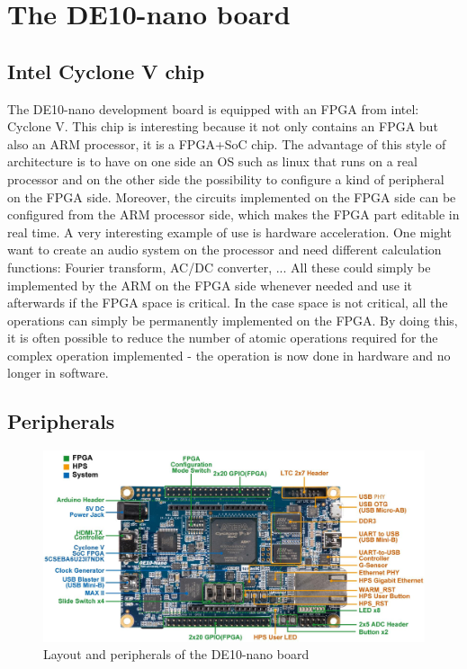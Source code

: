 \documentclass[12pt]{article}
\begin{document}
\section{The DE10-nano board}

\subsection{Intel Cyclone V chip}
The DE10-nano development board is equipped with an FPGA from intel: Cyclone V. This chip is interesting because it not only contains an FPGA but also an ARM processor, it is a FPGA+SoC chip. The advantage of this style of architecture is to have on one side an OS such as linux that runs on a real processor and on the other side the possibility to configure a kind of peripheral on the FPGA side. Moreover, the circuits implemented on the FPGA side can be configured from the ARM processor side, which makes the FPGA part editable in real time. A very interesting example of use is hardware acceleration. One might want to create an audio system on the processor and need different calculation functions: Fourier transform, AC/DC converter, ... All these could simply be implemented by the ARM on the FPGA side whenever needed and use it afterwards if the FPGA space is critical. In the case space is not critical, all the operations can simply be permanently implemented on the FPGA. By doing this, it is often possible to reduce the number of atomic operations required for the complex operation implemented - the operation is now done in hardware and no longer in software.

\subsection{Peripherals}

\begin{figure}
  \center
  \includegraphics[width=15cm]{"res/chapter1/layout_components.png"}
  \caption{Layout and peripherals of the DE10-nano board}
  \label{fig:de10nano_peripherals}
\end{figure}
\end{document}
